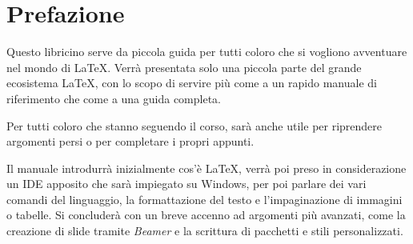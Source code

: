 \chapter*{Prefazione}

Questo libricino serve da piccola guida per tutti coloro che si vogliono 
avventuare nel mondo di \LaTeX. Verrà presentata solo una piccola parte del 
grande ecosistema \LaTeX, con lo scopo di servire più come a un rapido manuale 
di riferimento che come a una guida completa.

Per tutti coloro che stanno seguendo il corso, sarà anche utile per riprendere 
argomenti persi o per completare i propri appunti.

Il manuale introdurrà inizialmente cos'è \LaTeX, verrà poi preso in 
considerazione un IDE apposito che sarà impiegato su Windows, per poi parlare 
dei vari comandi del linguaggio, la formattazione del testo e l'impaginazione 
di immagini o tabelle. Si concluderà con un breve accenno ad argomenti più 
avanzati, come la creazione di slide tramite \textit{Beamer} e la scrittura di 
pacchetti e stili personalizzati.